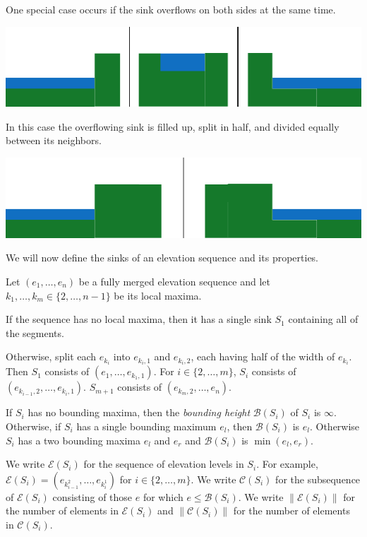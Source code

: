 \documentclass[11pt,a4paper]{article}
\newcommand{\norm}[1]{\left\lVert #1 \right\rVert}
\begin{document}
One special case occurs if the sink overflows on both sides at the same time.
\begin{center}
  \includegraphics{im13.pdf}
\end{center}
In this case the overflowing sink is filled up, split in half, and divided equally between its neighbors.
\begin{center}
  \includegraphics{im14.pdf}
\end{center}

We will now define the sinks of an elevation sequence and its properties.

Let $(e_1,\ldots,e_n)$ be a fully merged elevation sequence and let $k_1,\ldots,k_m \in \{2,\ldots,n-1\}$ be its local maxima.

If the sequence has no local maxima, then it has a single sink $S_1$ containing all of the segments.

Otherwise, split each $e_{k_i}$ into $e_{k_i,1}$ and $e_{k_i,2}$, each having half of the width of $e_{k_i}$.
Then $S_1$ consists of $(e_1,\ldots,e_{k_1,1})$.
For $i\in\{2,\ldots,m\}$, $S_i$ consists of $(e_{k_{i-1},2},\ldots,e_{k_i,1})$.
$S_{m+1}$ consists of $(e_{k_m,2},\ldots,e_n)$.

If $S_i$ has no bounding maxima, then the \textit{bounding height} $\mathcal{B}(S_i)$ of $S_i$ is $\infty$.
Otherwise, if $S_i$ has a single bounding maximum $e_l$, then $\mathcal{B}(S_i)$ is $e_l$.
Otherwise $S_i$ has a two bounding maxima $e_l$ and $e_r$ and $\mathcal{B}(S_i)$ is $\min(e_l, e_r)$.

We write $\mathcal{E}(S_i)$ for the sequence of elevation levels in $S_i$.
For example, $\mathcal{E}(S_i) = (e_{k_{i-1}^2},\ldots,e_{k_i^1})$ for $i\in\{2,\ldots,m\}$.
We write $\mathcal{C}(S_i)$ for the subsequence of $\mathcal{E}(S_i)$ consisting of those $e$ for which $e \le \mathcal{B}(S_i)$.
We write $\norm{\mathcal{E}(S_i)}$ for the number of elements in $\mathcal{E}(S_i)$ and $\norm{\mathcal{C}(S_i)}$ for the number of elements in $\mathcal{C}(S_i)$.
\end{document}
